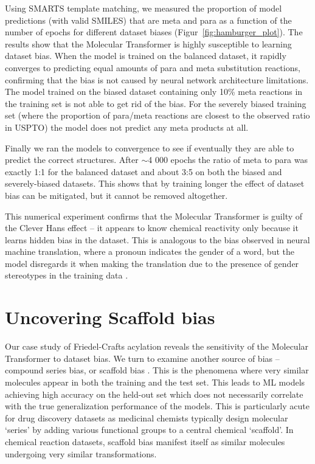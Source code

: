 Using SMARTS template matching, we measured the proportion of model predictions (with valid SMILES) that are meta and para as a function of the number of epochs for different dataset biases (Figur~\ref{fig:hamburger_plot}). The results show that the Molecular Transformer is highly susceptible to learning dataset bias. When the model is trained on the balanced dataset, it rapidly converges to predicting equal amounts of para and meta substitution reactions, confirming that the bias is not caused by neural network architecture limitations. The model trained on the biased dataset containing only 10\% meta reactions in the training set is not able to get rid of the bias. For the severely biased training set (where the proportion of para/meta reactions are closest to the observed ratio in USPTO) the model does not predict any meta products at all.

Finally we ran the models to convergence to see if eventually they are able to predict the correct structures. After $\sim$4 000 epochs the ratio of meta to para was exactly 1:1 for the balanced dataset and about 3:5 on both the biased and severely-biased datasets. This shows that by training longer the effect of dataset bias can be mitigated, but it cannot be removed altogether. 

This numerical experiment confirms that the Molecular Transformer is guilty of the Clever Hans effect -- it appears to know chemical reactivity only because it learns hidden bias in the dataset. This is analogous to the bias observed in neural machine translation, where a pronoun indicates the gender of a word, but the model disregards it when making the translation due to the presence of gender stereotypes in the training data \cite{Stanovsky2019GenderBias}.

\section{Uncovering Scaffold bias}

Our case study of Friedel-Crafts acylation reveals the sensitivity of the Molecular Transformer to dataset bias. We turn to examine another source of bias -- compound series bias, or scaffold bias \cite{Mayr2018compare}. This is the phenomena where very similar molecules appear in both the training and the test set. This leads to ML models achieving high accuracy on the held-out set which does not necessarily correlate with the true generalization performance of the models. This is particularly acute for drug discovery datasets as medicinal chemists typically design molecular `series' by adding various functional groups to a central chemical `scaffold'. In chemical reaction datasets, scaffold bias manifest itself as similar molecules undergoing very similar transformations.

